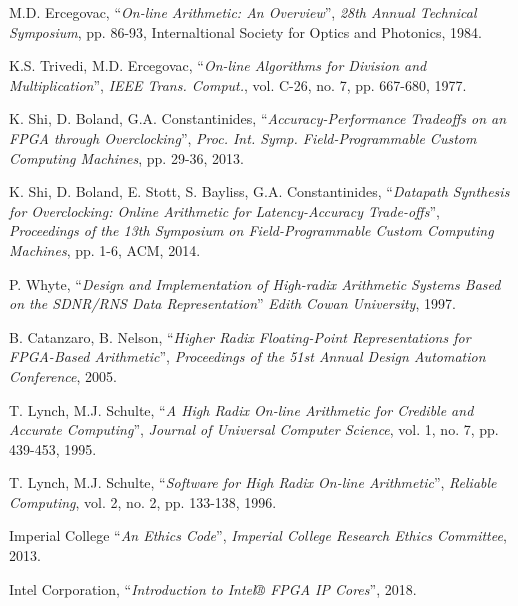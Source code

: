 \begin{thebibliography}{1}
  M.D. Ercegovac,
  ``\textit{On-line Arithmetic: An Overview}'',
  \textit{28th Annual Technical Symposium}, pp. 86-93,
  Internaltional Society for Optics and Photonics,
  1984.

  K.S. Trivedi, M.D. Ercegovac,
  ``\textit{On-line Algorithms for Division and Multiplication}'',
  \textit{IEEE Trans. Comput.}, vol. C-26, no. 7, pp. 667-680,
  1977.

  K. Shi, D. Boland, G.A. Constantinides,
  ``\textit{Accuracy-Performance Tradeoffs on an FPGA through Overclocking}'',
  \textit{Proc. Int. Symp. Field-Programmable Custom Computing Machines},
  pp. 29-36,
  2013.

  K. Shi, D. Boland, E. Stott, S. Bayliss, G.A. Constantinides,
  ``\textit{Datapath Synthesis for Overclocking: Online Arithmetic for
  Latency-Accuracy Trade-offs}'',
  \textit{Proceedings of the 13th Symposium on Field-Programmable Custom
  Computing Machines},
  pp. 1-6, ACM,
  2014.

  P. Whyte,
  ``\textit{Design and Implementation of High-radix Arithmetic Systems Based
  on the SDNR/RNS Data Representation}''
  \textit{Edith Cowan University},
  1997.

  B. Catanzaro, B. Nelson,
  ``\textit{Higher Radix Floating-Point Representations for FPGA-Based
  Arithmetic}'',
  \textit{Proceedings of the 51st Annual Design Automation Conference},
  2005.

  T. Lynch, M.J. Schulte,
  ``\textit{A High Radix On-line Arithmetic for Credible and Accurate
  Computing}'',
  \textit{Journal of Universal Computer Science}, vol. 1, no. 7, pp. 439-453,
  1995.

  T. Lynch, M.J. Schulte,
  ``\textit{Software for High Radix On-line Arithmetic}'',
  \textit{Reliable Computing}, vol. 2, no. 2, pp. 133-138,
  1996.

  Imperial College
  ``\textit{An Ethics Code}'',
  \textit{Imperial College Research Ethics Committee},
  2013.

  Intel Corporation,
  ``\textit{Introduction to Intel® FPGA IP Cores}'',
  2018.

\end{thebibliography}